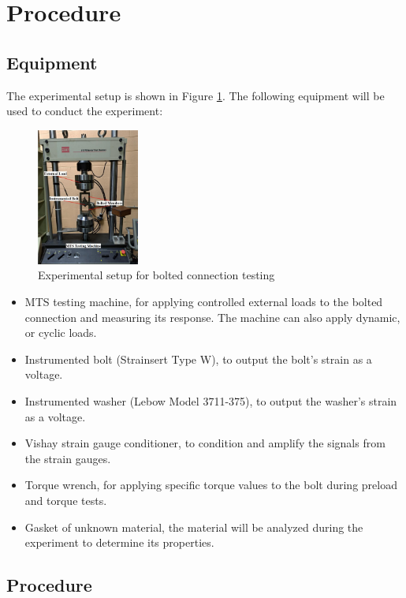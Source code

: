 \section{Procedure}
\label{sec:procedure}

\subsection{Equipment}
The experimental setup is shown in Figure \ref{fig:MTS Machine}. The following equipment will be used to conduct the experiment:
\begin{figure}[h]
    \centering
    \includegraphics[width=0.3\textwidth]{Sections/Figures/MTS Machine.png}
    \caption{Experimental setup for bolted connection testing}
    \label{fig:MTS Machine}
\end{figure}
\begin{itemize}
    \item MTS testing machine, for applying controlled external loads to the bolted connection and measuring its response. The machine can also apply dynamic, or cyclic loads. 
    \item Instrumented bolt (Strainsert Type W), to output the bolt's strain as a voltage.
    \item Instrumented washer (Lebow Model 3711-375), to output the washer's strain as a voltage.
    \item Vishay strain gauge conditioner, to condition and amplify the signals from the strain gauges. 
    \item Torque wrench, for applying specific torque values to the bolt during preload and torque tests.
    \item Gasket of unknown material, the material will be analyzed during the experiment to determine its properties.
\end{itemize}


\subsection{Procedure}
